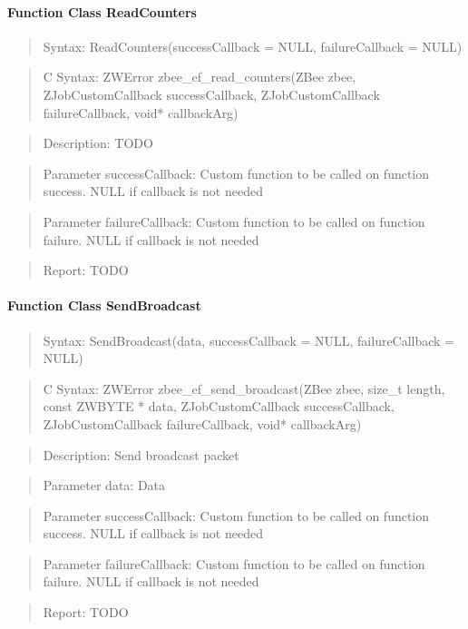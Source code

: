 \paragraph{Function Class ReadCounters}
\begin{quote}Syntax: ReadCounters(successCallback = NULL, failureCallback = NULL)\end{quote}
\begin{quote}C Syntax: ZWError zbee\_ef\_read\_counters(ZBee zbee, ZJobCustomCallback successCallback, ZJobCustomCallback failureCallback, void* callbackArg)\end{quote}
\begin{quote}Description: TODO\end{quote}
\begin{quote}Parameter successCallback: Custom function to be called on function success. NULL if callback is not needed\end{quote}
\begin{quote}Parameter failureCallback: Custom function to be called on function failure. NULL if callback is not needed\end{quote}
\begin{quote}Report: TODO\end{quote}

\paragraph{Function Class SendBroadcast}
\begin{quote}Syntax: SendBroadcast(data, successCallback = NULL, failureCallback = NULL)\end{quote}
\begin{quote}C Syntax: ZWError zbee\_ef\_send\_broadcast(ZBee zbee, size\_t length, const ZWBYTE * data, ZJobCustomCallback successCallback, ZJobCustomCallback failureCallback, void* callbackArg)\end{quote}
\begin{quote}Description: Send broadcast packet\end{quote}
\begin{quote}Parameter data: Data\end{quote}
\begin{quote}Parameter successCallback: Custom function to be called on function success. NULL if callback is not needed\end{quote}
\begin{quote}Parameter failureCallback: Custom function to be called on function failure. NULL if callback is not needed\end{quote}
\begin{quote}Report: TODO\end{quote}

